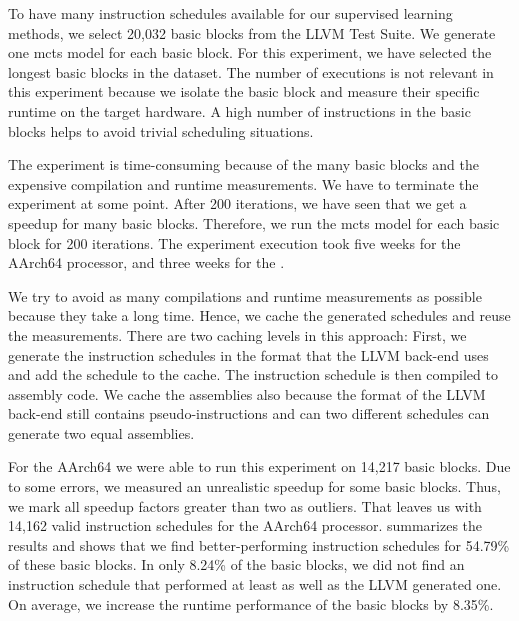 
To have many instruction schedules available for our supervised learning methods, we select 20,032 basic blocks from the LLVM Test Suite.%
We generate one \ac{mcts} model for each basic block.
For this experiment, we have selected the longest basic blocks in the dataset.
The number of executions is not relevant in this experiment because we isolate the basic block and measure their specific runtime on the target hardware.
A high number of instructions in the basic blocks helps to avoid trivial scheduling situations.

The experiment is time-consuming because of the many basic blocks and the expensive compilation and runtime measurements.
We have to terminate the experiment at some point.
After 200 iterations, we have seen that we get a speedup for many basic blocks.
Therefore, we run the \ac{mcts} model for each basic block for 200 iterations.
The experiment execution took five weeks for the AArch64 processor, and three weeks for the \aurora.


We try to avoid as many compilations and runtime measurements as possible because they take a long time.
Hence, we cache the generated schedules and reuse the measurements.
There are two caching levels in this approach:
First, we generate the instruction schedules in the format that the LLVM back-end uses and add the schedule to the cache.
The instruction schedule is then compiled to assembly code.
We cache the assemblies also because the format of the LLVM back-end still contains pseudo-instructions and can two different schedules can generate two equal assemblies.

For the AArch64 we were able to run this experiment on 14,217 basic blocks.
Due to some errors, we measured an unrealistic speedup for some basic blocks.
Thus, we mark all speedup factors greater than two as outliers.
That leaves us with 14,162 valid instruction schedules for the AArch64 processor.
 summarizes the results and shows that we find better-performing instruction schedules for 54.79\% of these basic blocks.
In only 8.24\% of the basic blocks, we did not find an instruction schedule that performed at least as well as the LLVM generated one.
On average, we increase the runtime performance of the basic blocks by 8.35\%.

